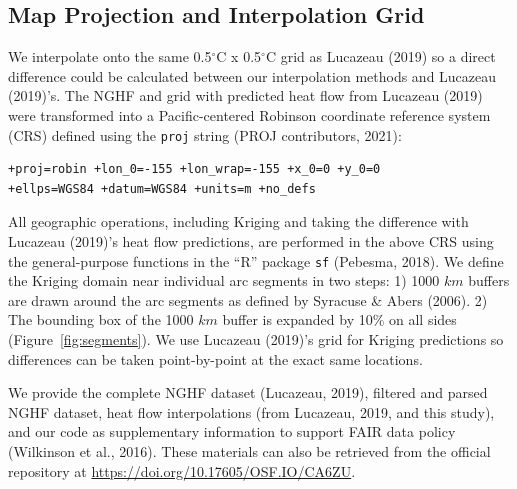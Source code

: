 \documentclass[draft,linenumbers]{agujournal2018}
\begin{document}
\subsection{Map Projection and Interpolation Grid}

We interpolate onto the same 0.5\(^{\circ}\)C x 0.5\(^{\circ}\)C grid as
Lucazeau (2019) so a direct difference could be calculated between our
interpolation methods and Lucazeau (2019)'s. The NGHF and grid with
predicted heat flow from Lucazeau (2019) were transformed into a
Pacific-centered Robinson coordinate reference system (CRS) defined
using the \texttt{proj} string (PROJ contributors, 2021):

\begin{verbatim}
+proj=robin +lon_0=-155 +lon_wrap=-155 +x_0=0 +y_0=0
+ellps=WGS84 +datum=WGS84 +units=m +no_defs
\end{verbatim}

All geographic operations, including Kriging and taking the difference
with Lucazeau (2019)'s heat flow predictions, are performed in the above
CRS using the general-purpose functions in the ``R'' package \texttt{sf}
(Pebesma, 2018). We define the Kriging domain near individual arc
segments in two steps: 1) 1000 \(km\) buffers are drawn around the arc
segments as defined by Syracuse \& Abers (2006). 2) The bounding box of
the 1000 \(km\) buffer is expanded by 10\% on all sides
(Figure~\ref{fig:segments}). We use Lucazeau (2019)'s grid for Kriging
predictions so differences can be taken point-by-point at the exact same
locations.

We provide the complete NGHF dataset (Lucazeau, 2019), filtered and
parsed NGHF dataset, heat flow interpolations (from Lucazeau, 2019, and
this study), and our code as supplementary information to support FAIR
data policy (Wilkinson et al., 2016). These materials can also be
retrieved from the official repository at
\url{https://doi.org/10.17605/OSF.IO/CA6ZU}.
\end{document}
